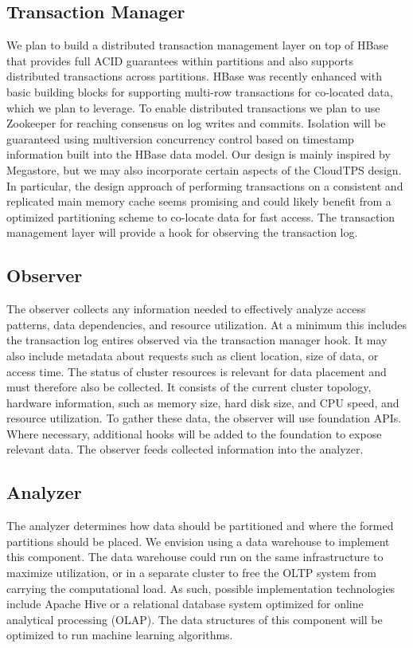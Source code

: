 \documentclass[10pt,final,journal]{IEEEtran}
\begin{document}
\subsection{Transaction Manager}
We plan to build a distributed transaction management layer on top of HBase that provides full ACID guarantees within partitions and also supports distributed transactions across partitions. HBase was recently enhanced with basic building blocks for supporting multi-row transactions for co-located data, which we plan to leverage. To enable distributed transactions we plan to use Zookeeper for reaching consensus on log writes and commits. Isolation will be guaranteed using multiversion concurrency control based on timestamp information built into the HBase data model. Our design is mainly inspired by Megastore, but we may also incorporate certain aspects of the CloudTPS design. In particular, the design approach of performing transactions on a consistent and replicated main memory cache seems promising and could likely benefit from a optimized partitioning scheme to co-locate data for fast access. The transaction management layer will provide a hook for observing the transaction log.

\subsection{Observer}
The observer collects any information needed to effectively analyze access patterns, data dependencies, and resource utilization. At a minimum this includes the transaction log entires observed via the transaction manager hook. It may also include metadata about requests such as client location, size of data, or access time. The status of cluster resources is relevant for data placement and must therefore also be collected. It consists of the current cluster topology, hardware information, such as memory size, hard disk size, and CPU speed, and resource utilization. To gather these data, the observer will use foundation APIs. Where necessary, additional hooks will be added to the foundation to expose relevant data. The observer feeds collected information into the analyzer.

\subsection{Analyzer}
The analyzer determines how data should be partitioned and where the formed partitions should be placed. We envision using a data warehouse to implement this component. The data warehouse could run on the same infrastructure to maximize utilization, or in a separate cluster to free the OLTP system from carrying the computational load. As such, possible implementation technologies include Apache Hive or a relational database system optimized for online analytical processing (OLAP). The data structures of this component will be optimized to run machine learning algorithms.
\end{document}
